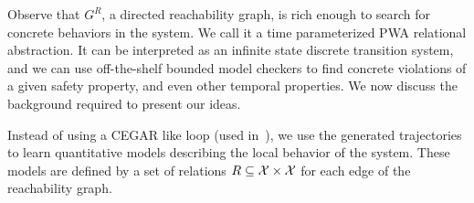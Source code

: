 
Observe that $G^R$, a directed reachability graph, is rich enough to
search for concrete behaviors in the system. We call it a time
parameterized PWA relational abstraction. It can be interpreted as an
infinite state discrete transition system, and we can use
off-the-shelf bounded model checkers to find concrete violations of a
given safety property, and even other temporal properties.  We now
discuss the background required to present our ideas.



Instead of using a CEGAR like loop (used in~\cite{zutshi2014multiple}),
we use the generated trajectories to learn quantitative models
describing the local behavior of the system. These models are defined
by a set of relations $R \subseteq \mathcal{X} \times \mathcal{X}$
for each edge of the reachability graph.
